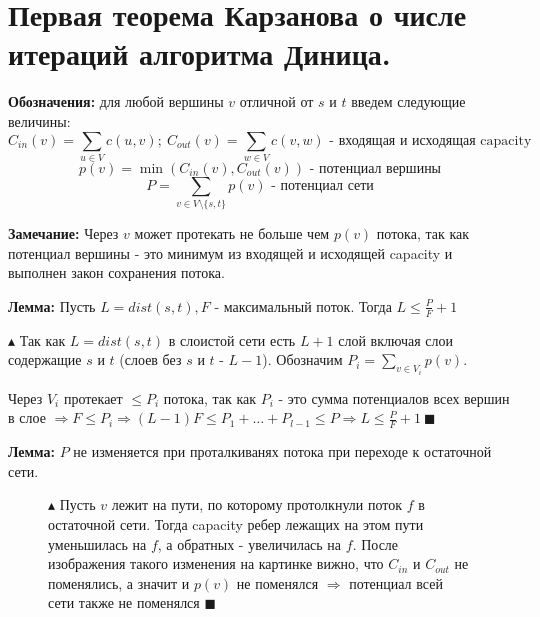 \section{Первая теорема Карзанова о числе итераций алгоритма Диница.}
\par \textbf{Обозначения:} для любой вершины $v$ отличной от $s$ и $t$ введем следующие величины:
$$C_{in}(v)=\sum_{u \in V}c(u,v); \: C_{out}(v)=\sum_{w \in V} c(v, w) \text{ - входящая и исходящая capacity}$$
$$p(v)=\min(C_{in}(v), C_{out}(v)) \text{ - потенциал вершины}$$
$$P=\sum_{v \in V \setminus \{s, t\}} p(v) \text{ - потенциал сети}$$
\par \textbf{Замечание:} Через $v$ может протекать не больше чем $p(v)$ потока, так как потенциал вершины - это минимум из входящей и исходящей capacity и выполнен закон сохранения потока.
\par \textbf{Лемма:} Пусть $L=dist(s,t), F$ - максимальный поток. Тогда $L \leq \frac{P}{F}+1$
\par $\blacktriangle$ Так как $L=dist(s,t)$ в слоистой сети есть $L+1$ слой включая слои содержащие $s$ и $t$ (слоев без $s$ и $t$ - $L-1$). Обозначим $P_i=\sum_{v \in V_i} p(v)$. \par Через $V_i$ протекает $\leq P_i$ потока, так как $P_i$ - это сумма потенциалов всех вершин в слое $\Rightarrow F \leq P_i \Rightarrow  (L-1)F \leq P_1+\ldots +P_{l-1} \leq P \Rightarrow L \leq \frac{P}{F}+1 \: \blacksquare$
\par \textbf{Лемма:} $P$ не изменяется при проталкиванях потока при переходе к остаточной сети.
\begin{figure}[h]
\hspace{-4ex} \begin{minipage}[h]{0.3\linewidth}

\end{minipage}
\hfill
\hspace{-4ex} \begin{minipage}[h]{0.7\linewidth}
\par $\blacktriangle$ Пусть $v$ лежит на пути, по которому протолкнули поток $f$ в остаточной сети. Тогда capacity ребер лежащих на этом пути уменьшилась на $f$, а обратных - увеличилась на $f$. После изображения такого изменения на картинке вижно, что $C_{in}$ и $C_{out}$ не поменялись, а значит и $p(v)$ не поменялся $\Rightarrow$ потенциал всей сети также не поменялся $\blacksquare$
\end{minipage}
\end{figure}

